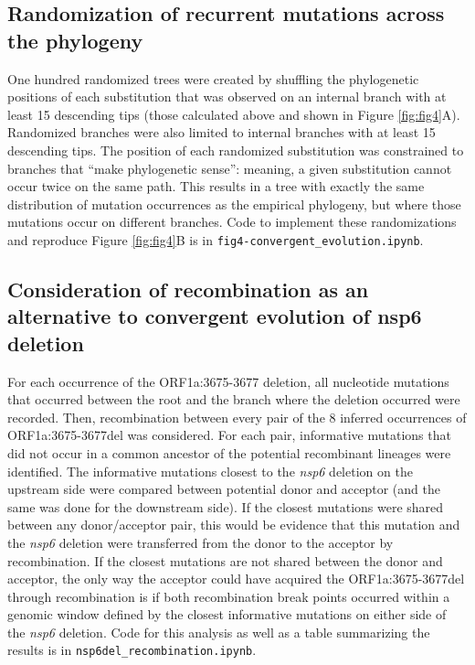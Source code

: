 \documentclass[12pt, letterpaper]{article}
\begin{document}
\subsection*{Randomization of recurrent mutations across the phylogeny}
One hundred randomized trees were created by shuffling the phylogenetic positions of each substitution that was observed on an internal branch with at least 15 descending tips (those calculated above and shown in Figure \ref{fig:fig4}A). Randomized branches were also limited to internal branches with at least 15 descending tips. The position of each randomized substitution was constrained to branches that “make phylogenetic sense”: meaning, a given substitution cannot occur twice on the same path. This results in a tree with exactly the same distribution of mutation occurrences as the empirical phylogeny, but where those mutations occur on different branches. Code to implement these randomizations and reproduce Figure \ref{fig:fig4}B is in \texttt{fig4-convergent\_evolution.ipynb}.

\subsection*{Consideration of recombination as an alternative to convergent evolution of nsp6 deletion}
For each occurrence of the ORF1a:3675-3677 deletion, all nucleotide mutations that occurred between the root and the branch where the deletion occurred were recorded. Then, recombination between every pair of the 8 inferred occurrences of ORF1a:3675-3677del was considered. For each pair, informative mutations that did not occur in a common ancestor of the potential recombinant lineages were identified. The informative mutations closest to the \emph{nsp6} deletion on the upstream side were compared between potential donor and acceptor (and the same was done for the downstream side). If the closest mutations were shared between any donor/acceptor pair, this would be evidence that this mutation and the \emph{nsp6} deletion were transferred from the donor to the acceptor by recombination. If the closest mutations are not shared between the donor and acceptor, the only way the acceptor could have acquired the ORF1a:3675-3677del through recombination is if both recombination break points occurred within a genomic window defined by the closest informative mutations on either side of the \emph{nsp6} deletion. Code for this analysis as well as a table summarizing the results is in \texttt{nsp6del\_recombination.ipynb}.
\end{document}
